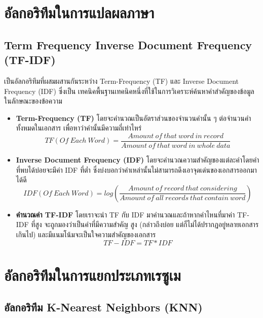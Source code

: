 \section{อัลกอริทึมในการแปลผลภาษา}
\subsection{Term Frequency Inverse Document Frequency (TF-IDF)}
\label{subsec:tf-idf}
เป็นอัลกอริทึมที่ผสมผสานกันระหว่าง Term-Frequency (TF) และ Inverse Document Frequency (IDF) ซึ่งเป็น
เทคนิคพื้นฐานเทคนิคหนึ่งที่ใช้ในการวิเคราะห์ค้นหาคำสำคัญของข้อมูลในลักษณะของข้อความ \cite{tf-idf}
\begin{itemize}
      \item \textbf{Term-Frequency (TF)} โดยจะคำนวณเป็นอัตราส่วนของจำนวนคำนั้น ๆ ต่อจำนวนคำทั้งหมดในเอกสาร
            เพื่อหาว่าคำนั้นมีความถี่เท่าไหร่
            \[TF(Of\ Each\ Word)=\frac{Amount\ of\ that\ word\ in\ record}{Amount\ of\ that\ word\ in\ whole\ data}\]
      \item \textbf{Inverse Document Frequency (IDF)} โดยจะคำนวณความสำคัญของแต่ละคำโดยคำที่พบได้บ่อยจะมีค่า IDF ที่ต่ำ
            ซึ่งบ่งบอกว่าคำเหล่านั้นไม่สามารถดึงเอาจุดเด่นของเอกสารออกมาได้ดี
            \[IDF(Of\ Each\ Word)=log(\frac{Amount\ of\ record\ that\ considering}{Amount\ of\ all\ records\ that\ contain\ word})\]
      \item \textbf{คำนวณค่า TF-IDF} โดยเราจะนำ TF กับ IDF มาคำนวณและถ้าหากคำไหนที่มาค่า TF-IDF ที่สูง จะถูกมองว่าเป็นคำที่มีความสำคัญ
            สูง (กล่าวถึงบ่อย แต่ก็ไม่ได้ปรากฏอยู่หลายเอกสารเกินไป) และมีแนมโน้มจะเป็นใจความสำคัญของเอกสาร
            \[TF{-}IDF = TF * IDF\]
\end{itemize}
\section{อัลกอริทึมในการแยกประเภทเรซูเม}
\subsection{อัลกอริทึม K-Nearest Neighbors (KNN)}

